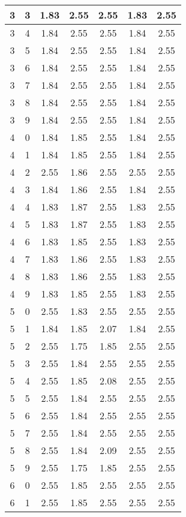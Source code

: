 \begin{longtable}{|c|c||c||c|c||c|c|}
	3 & 3 & 1.83 & 2.55 & 2.55 & 1.83 & 2.55 \\ \hline
	3 & 4 & 1.84 & 2.55 & 2.55 & 1.84 & 2.55 \\ \hline
	3 & 5 & 1.84 & 2.55 & 2.55 & 1.84 & 2.55 \\ \hline
	3 & 6 & 1.84 & 2.55 & 2.55 & 1.84 & 2.55 \\ \hline
	3 & 7 & 1.84 & 2.55 & 2.55 & 1.84 & 2.55 \\ \hline
	3 & 8 & 1.84 & 2.55 & 2.55 & 1.84 & 2.55 \\ \hline
	3 & 9 & 1.84 & 2.55 & 2.55 & 1.84 & 2.55 \\ \hline
	4 & 0 & 1.84 & 1.85 & 2.55 & 1.84 & 2.55 \\ \hline
	4 & 1 & 1.84 & 1.85 & 2.55 & 1.84 & 2.55 \\ \hline
	4 & 2 & 2.55 & 1.86 & 2.55 & 2.55 & 2.55 \\ \hline
	4 & 3 & 1.84 & 1.86 & 2.55 & 1.84 & 2.55 \\ \hline
	4 & 4 & 1.83 & 1.87 & 2.55 & 1.83 & 2.55 \\ \hline
	4 & 5 & 1.83 & 1.87 & 2.55 & 1.83 & 2.55 \\ \hline
	4 & 6 & 1.83 & 1.85 & 2.55 & 1.83 & 2.55 \\ \hline
	4 & 7 & 1.83 & 1.86 & 2.55 & 1.83 & 2.55 \\ \hline
	4 & 8 & 1.83 & 1.86 & 2.55 & 1.83 & 2.55 \\ \hline
	4 & 9 & 1.83 & 1.85 & 2.55 & 1.83 & 2.55 \\ \hline
	5 & 0 & 2.55 & 1.83 & 2.55 & 2.55 & 2.55 \\ \hline
	5 & 1 & 1.84 & 1.85 & 2.07 & 1.84 & 2.55 \\ \hline
	5 & 2 & 2.55 & 1.75 & 1.85 & 2.55 & 2.55 \\ \hline
	5 & 3 & 2.55 & 1.84 & 2.55 & 2.55 & 2.55 \\ \hline
	5 & 4 & 2.55 & 1.85 & 2.08 & 2.55 & 2.55 \\ \hline
	5 & 5 & 2.55 & 1.84 & 2.55 & 2.55 & 2.55 \\ \hline
	5 & 6 & 2.55 & 1.84 & 2.55 & 2.55 & 2.55 \\ \hline
	5 & 7 & 2.55 & 1.84 & 2.55 & 2.55 & 2.55 \\ \hline
	5 & 8 & 2.55 & 1.84 & 2.09 & 2.55 & 2.55 \\ \hline
	5 & 9 & 2.55 & 1.75 & 1.85 & 2.55 & 2.55 \\ \hline
	6 & 0 & 2.55 & 1.85 & 2.55 & 2.55 & 2.55 \\ \hline
	6 & 1 & 2.55 & 1.85 & 2.55 & 2.55 & 2.55 \\ \hline

\end{longtable}
